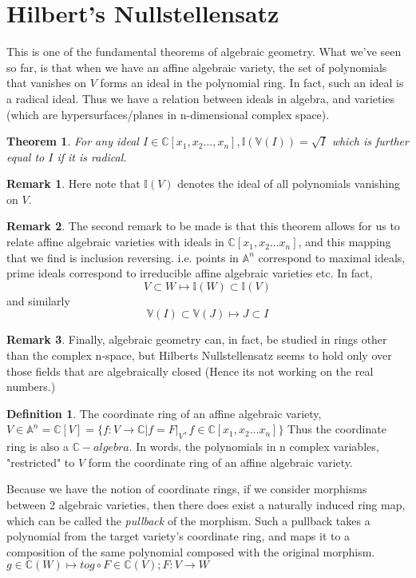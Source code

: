 \documentclass[12pt]{book}
\newtheorem{theorem}{Theorem}[chapter]
\theoremstyle{definition}
\newtheorem*{definition}{Definition}
\newtheorem*{remark}{Remark}
\begin{document}
\section{Hilbert's Nullstellensatz}
This is one of the fundamental theorems of algebraic geometry. What we've seen so far, is that when we have an affine algebraic variety, the set of polynomials that vanishes on $V$ forms an ideal in the polynomial ring. In fact, such an ideal is a radical ideal. Thus we have a relation between ideals in algebra, and varieties (which are hypersurfaces/planes in n-dimensional complex space).
\begin{theorem}
    For any ideal $I \in \mathbb{C}[x_1, x_2 \ldots, x_n], \mathbb{I}(\mathbb{V}(I)) = \sqrt{I}$ which is further equal to $I$ if it is radical.
\end{theorem}
\begin{remark}
    Here note that $\mathbb{I}(V)$ denotes the ideal of all polynomials vanishing on $V$.
\end{remark}
\begin{remark}
    The second remark to be made is that this theorem allows for us to relate affine algebraic varieties with ideals in $\mathbb{C}[x_1,x_2\ldots x_n]$, and this mapping that we find is inclusion reversing. i.e. points in $\mathbb{A}^n$ correspond to maximal ideals, prime ideals correspond to irreducible affine algebraic varieties etc. In fact,
    $$V \subset W \mapsto \mathbb{I}(W) \subset \mathbb{I}(V) $$ and similarly
    $$\mathbb{V}(I) \subset \mathbb{V}(J) \mapsto J \subset I $$
\end{remark}
\begin{remark}
    Finally, algebraic geometry can, in fact, be studied in rings other than the complex n-space, but Hilberts Nullstellensatz seems to hold only over those fields that are algebraically closed (Hence its not working on the real numbers.)
\end{remark}
\begin{definition}
    The coordinate ring of an affine algebraic variety, $V \in \mathbb{A}^n = \mathbb{C}[V] = \{f: V \to \mathbb{C} | f = F|_V, f \in \mathbb{C}[x_1, x_2 \ldots x_n]\}$
    Thus the coordinate ring is also a $\mathbb{C}-algebra$. In words, the polynomials in n complex variables, "restricted" to $V$ form the coordinate ring of an affine algebraic variety.
\end{definition}
Because we have the notion of coordinate rings, if we consider morphisms between 2 algebraic varieties, then there does exist a naturally induced ring map, which can be called the \textit{pullback} of the morphism. Such a pullback takes a polynomial from the target variety's coordinate ring, and maps it to a composition of the same polynomial composed with the original morphism. $ g \in \mathbb{C}(W) \mapsto to g \circ F \in \mathbb{C}(V); F: V \to W$
\end{document}
